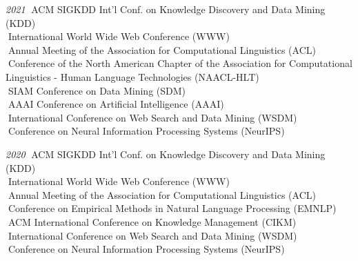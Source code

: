 \documentclass[10pt]{article}
\newenvironment{myindentpar}[1]%
{\begin{list}{}%
         {\setlength{\leftmargin}{#1}}%
         \item[]%
}
{\end{list}}
\newcounter{list}
\begin{document}
\begin{myindentpar}{0.75cm}
{\hspace{-0.75cm}\textit{2021}
\textcolor{white}{.}ACM SIGKDD Int'l Conf. on Knowledge Discovery and Data Mining (KDD) \\
\textcolor{white}{.}International World Wide Web Conference (WWW) \\
\textcolor{white}{.}Annual Meeting of the Association for Computational Linguistics (ACL) \\
\textcolor{white}{.}Conference of the North American Chapter of the Association for Computational Linguistics - Human Language Technologies (NAACL-HLT) \\
\textcolor{white}{.}SIAM Conference on Data Mining (SDM) \\
\textcolor{white}{.}AAAI Conference on Artificial Intelligence (AAAI) \\
\textcolor{white}{.}International Conference on Web Search and Data Mining (WSDM) \\
\textcolor{white}{.}Conference on Neural Information Processing Systems (NeurIPS)

\hspace{-0.75cm}\textit{2020}
\textcolor{white}{.}ACM SIGKDD Int'l Conf. on Knowledge Discovery and Data Mining (KDD) \\
\textcolor{white}{.}International World Wide Web Conference (WWW) \\
\textcolor{white}{.}Annual Meeting of the Association for Computational Linguistics (ACL) \\
\textcolor{white}{.}Conference on Empirical Methods in Natural Language Processing (EMNLP) \\
\textcolor{white}{.}ACM International Conference on Knowledge Management (CIKM) \\
\textcolor{white}{.}International Conference on Web Search and Data Mining (WSDM) \\
\textcolor{white}{.}Conference on Neural Information Processing Systems (NeurIPS)

}
\end{myindentpar}
\end{document}

